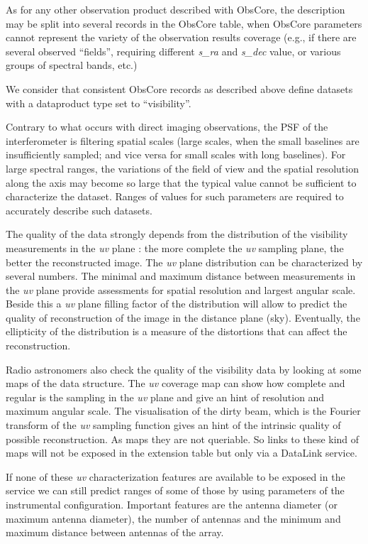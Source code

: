 \documentclass[11pt,a4paper]{ivoa}
\begin{document}
As for any other observation product described with ObsCore, the description may be split into
several records in the ObsCore table, when ObsCore parameters cannot represent the
variety of the observation results coverage (e.g., if there are several observed ``fields'',
requiring different \emph{s\_ra} and \emph{s\_dec} value, or various groups of spectral bands, etc.)

We consider that consistent ObsCore records as described above define datasets with
a dataproduct type set to ``visibility''.

Contrary to what occurs with direct imaging observations, the PSF of the interferometer
is filtering spatial scales (large scales, when the small baselines are insufficiently
sampled; and vice versa for small scales with long baselines).
For large spectral ranges, the variations of the field of view and the spatial resolution
along the axis may become so large that the typical value cannot be sufficient to
characterize the dataset. Ranges of values for such parameters are required to accurately
describe such datasets.

The quality of the data strongly depends from the distribution of the visibility measurements
in the \emph{uv} plane : the more complete the \emph{uv} sampling plane, the better the reconstructed image.
The \emph{uv} plane distribution can be characterized by several numbers.
The minimal and maximum distance between measurements in the \emph{uv} plane provide assessments for
spatial resolution and largest angular scale.
Beside this a \emph{uv} plane filling factor of the distribution will allow to predict the quality
of reconstruction of the image in the distance plane (sky).
Eventually, the ellipticity of the distribution is a measure of the distortions that can
affect the reconstruction.

Radio astronomers also check the quality of the visibility data by looking at some maps of
the data structure. The \emph{uv} coverage map can show how complete and regular is the sampling in
the \emph{uv} plane and give an hint of resolution and maximum angular scale.
The visualisation of the dirty beam, which is the Fourier transform of the \emph{uv} sampling
function gives an hint of the intrinsic quality of possible reconstruction. As maps they are
not queriable. So links to these kind of maps will not be exposed in the extension
table but only via a DataLink service.

If none of these \emph{uv} characterization features are available to be exposed in the service
we can still predict ranges of some of those by using parameters of the instrumental configuration. 
Important features are the antenna diameter (or maximum antenna diameter), the number of
antennas and the minimum and maximum distance between antennas of the array.
\end{document}
